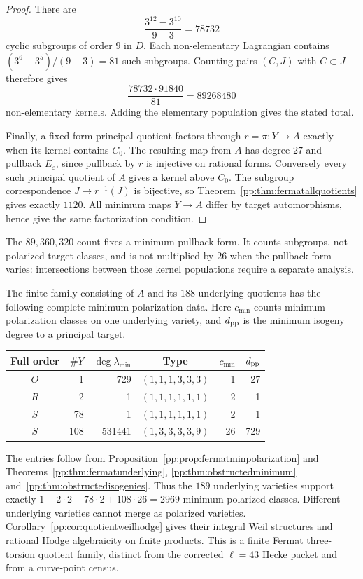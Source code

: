 \begin{proof}
There are
\[
 \frac{3^{12}-3^{10}}{9-3}=78732
\]
cyclic subgroups of order $9$ in $D$. Each non-elementary Lagrangian
contains $(3^6-3^5)/(9-3)=81$ such subgroups. Counting pairs
$(C,J)$ with $C\subset J$ therefore gives
\[
 \frac{78732\cdot91840}{81}=89268480
\]
non-elementary kernels. Adding the elementary population gives the
stated total.

Finally, a fixed-form principal quotient factors through
$r=\pi:Y\to A$ exactly when its kernel contains $C_0$.
The resulting map from $A$ has degree $27$ and pullback
$E_\varepsilon$, since pullback by $r$ is injective on rational forms.
Conversely every such principal quotient of $A$ gives a kernel above
$C_0$. The subgroup correspondence $J\mapsto r^{-1}(J)$ is bijective,
so Theorem~\ref{pp:thm:fermatallquotients} gives exactly $1120$.
All minimum maps $Y\to A$ differ by target automorphisms, hence give
the same factorization condition.
\end{proof}

The $89{,}360{,}320$ count fixes a minimum pullback form. It counts
subgroups, not polarized target classes, and is not multiplied by
$26$ when the pullback form varies: intersections between those
kernel populations require a separate analysis.

The finite family consisting of $A$ and its $188$ underlying quotients
has the following complete minimum-polarization data. Here $c_{\min}$
counts minimum polarization classes on one underlying variety, and
$d_{\rm pp}$ is the minimum isogeny degree to a principal target.
\begin{center}
\small
\begin{tabular}{c|r|r|c|r|r}
Full order & $\#Y$ & $\deg\lambda_{\min}$ & Type & $c_{\min}$ & $d_{\rm pp}$\\\hline
$O$ & 1 & 729 & $(1,1,1,3,3,3)$ & 1 & 27\\
$R$ & 2 & 1 & $(1,1,1,1,1,1)$ & 2 & 1\\
$S$ & 78 & 1 & $(1,1,1,1,1,1)$ & 2 & 1\\
$S$ & 108 & 531441 & $(1,3,3,3,3,9)$ & 26 & 729
\end{tabular}
\end{center}
The entries follow from Proposition~\ref{pp:prop:fermatminpolarization}
and Theorems~\ref{pp:thm:fermatunderlying},
\ref{pp:thm:obstructedminimum} and~\ref{pp:thm:obstructedisogenies}.
Thus the $189$ underlying varieties support exactly
$1+2\cdot2+78\cdot2+108\cdot26=2969$ minimum polarized classes.
Different underlying varieties cannot merge as polarized varieties.
Corollary~\ref{pp:cor:quotientweilhodge} gives their integral Weil
structures and rational Hodge algebraicity on finite products.
This is a finite Fermat three-torsion quotient family, distinct from
the corrected $\ell=43$ Hecke packet and from a curve-point census.

